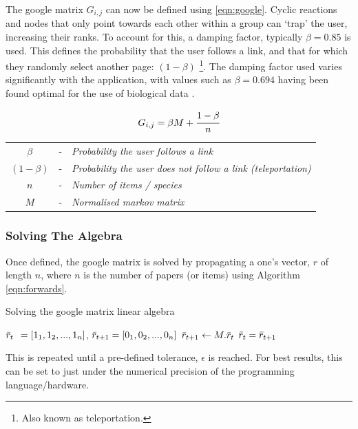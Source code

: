 The google matrix $G_{i,j}$ can now be defined using \autoref{eqn:google}.
 Cyclic reactions and nodes that only point towards each other within a group can `trap' the user, increasing their ranks.
 To account for this, a damping factor, typically $\beta = 0.85$ is used. This defines the probability that the user follows a link, and that for which they randomly select another page: $(1-\beta)$ \footnote{Also known as teleportation.}. The damping factor used varies significantly with the application, with values such as $\beta = 0.694$ having been found optimal for the use of biological data \citep{biopr}.


\begin{center}
\begin{equation}
     G_{i,j} = \beta M + \cfrac{1 - \beta}{n}
 \label{eqn:google}
\end{equation}
\begin{tabular}{ccl}
$\beta$&-&\textit{Probability the user follows a link} \\
 $(1 - \beta)$&-&\textit{Probability the user does not follow a link (teleportation)} \\
$n$&-&\textit{Number of items / species}\\
$M$&-&\textit{Normalised markov matrix}
\end{tabular}
\end{center}


\subsubsection{Solving The Algebra}

Once defined, the google matrix is solved by propagating a one's vector, $r$ of length $n$, where $n$ is the number of papers (or items) using Algorithm \ref{eqn:forwards}.


\begin{algorithm} \caption{Solving the google matrix linear algebra}
\begin{algorithmic}[1]
\State  $\Bar{r}_t \:\:= [1_1, 1_2, ... , 1_n]$, $\Bar{r}_{t+1} = [0_1, 0_2, ... , 0_n]$
\State
{}
\State $\Bar{r}_{t+1} \gets M . \Bar{r}_t$
\State $\Bar{r}_t = \Bar{r}_{t+1}$
\EndWhile
\end{algorithmic}\label{eqn:forwards}
\end{algorithm}


 This is repeated until a pre-defined tolerance, $\epsilon$ is reached. For best results, this can be set to just under the numerical precision of the programming language/hardware.


